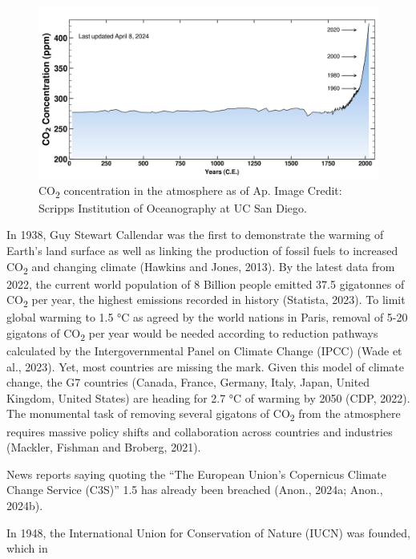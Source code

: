 \documentclass[
  letterpaper,
  DIV=11,
  numbers=noendperiod]{scrartcl}
\begin{document}
\begin{figure}[H]

{\centering \includegraphics{./images/co2-concentration.png}

}

\caption{CO\textsubscript{2} concentration in the atmosphere as of Ap.
Image Credit: Scripps Institution of Oceanography at UC San Diego.}

\end{figure}%

In 1938, Guy Stewart Callendar was the first to demonstrate the warming
of Earth's land surface as well as linking the production of fossil
fuels to increased CO\textsubscript{2} and changing climate (Hawkins and
Jones, 2013). By the latest data from 2022, the current world population
of 8 Billion people emitted 37.5 gigatonnes of CO\textsubscript{2} per
year, the highest emissions recorded in history (Statista, 2023). To
limit global warming to 1.5 °C as agreed by the world nations in Paris,
removal of 5-20 gigatons of CO\textsubscript{2} per year would be needed
according to reduction pathways calculated by the Intergovernmental
Panel on Climate Change (IPCC) (Wade et al., 2023). Yet, most countries
are missing the mark. Given this model of climate change, the G7
countries (Canada, France, Germany, Italy, Japan, United Kingdom, United
States) are heading for 2.7 °C of warming by 2050 (CDP, 2022). The
monumental task of removing several gigatons of CO\textsubscript{2} from
the atmosphere requires massive policy shifts and collaboration across
countries and industries (Mackler, Fishman and Broberg, 2021).

News reports saying quoting the ``The European Union's Copernicus
Climate Change Service (C3S)'' 1.5 has already been breached (Anon.,
2024a; Anon., 2024b).

In 1948, the International Union for Conservation of Nature (IUCN) was
founded, which in
\end{document}
